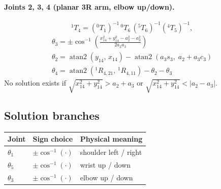 \documentclass[11pt]{article}
\begin{document}
\paragraph{Joints 2, 3, 4 (planar 3R arm, elbow up/down).}
\begin{equation}
  {}^{1}T_4=\left({}^{0}T_1\right)^{-1}\,{}^{0}T_6\,
            \left({}^{5}T_6\right)^{-1}\left({}^{4}T_5\right)^{-1},
\end{equation}
\begin{align}
  \boxed{\;\theta_3=\pm\cos^{-1}\!\left(
     \frac{x_{14}^2+y_{14}^2-a_2^2-a_3^2}{2a_2a_3}\right)\;}\\[4pt]
  \boxed{\;\theta_2=\operatorname{atan2}(y_{14},\,x_{14})
     -\operatorname{atan2}\!\left(a_3 s_3,\; a_2+a_3c_3\right)\;}\\[4pt]
  \boxed{\;\theta_4=\operatorname{atan2}\!\left({}^{1}R_{4,21},\,{}^{1}R_{4,11}\right)
     -\theta_2-\theta_3\;}
\end{align}
No solution exists if $\sqrt{x_{14}^2+y_{14}^2}>a_2+a_3$ or
$\sqrt{x_{14}^2+y_{14}^2}<\lvert a_2-a_3\rvert$.

\subsection*{Solution branches}
\begin{center}
\begin{tabular}{lll}
\toprule
Joint & Sign choice & Physical meaning\\
\midrule
$\theta_1$ & $\pm\cos^{-1}(\cdot)$ & shoulder left / right\\
$\theta_5$ & $\pm\cos^{-1}(\cdot)$ & wrist up / down\\
$\theta_3$ & $\pm\cos^{-1}(\cdot)$ & elbow up / down\\
\bottomrule
\end{tabular}
\end{center}
\end{document}
